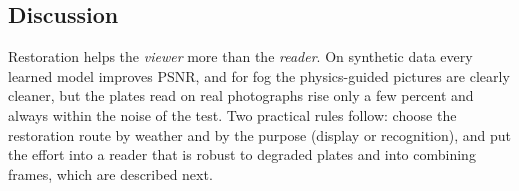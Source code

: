 \subsection{Discussion}

Restoration helps the \emph{viewer} more than the \emph{reader}. On synthetic
data every learned model improves PSNR, and for fog the physics-guided pictures
are clearly cleaner, but the plates read on real photographs rise only a few
percent and always within the noise of the test. Two practical rules follow:
choose the restoration route by weather and by the purpose (display or
recognition), and put the effort into a reader that is robust to degraded
plates and into combining frames, which are described next.


